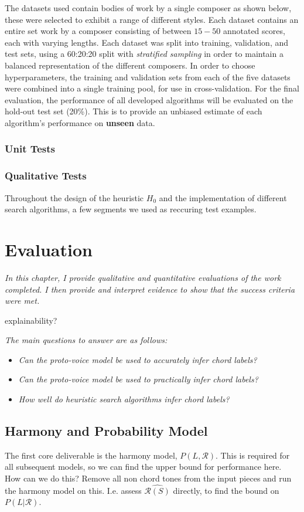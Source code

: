 \documentclass[12pt,a4paper,twoside,openany]{report} \usepackage[pdfborder={0 0 0}]{hyperref}    %
\theoremstyle{definition} \newtheorem{definition}{Definition}[section]
\begin{document}
The datasets used contain bodies of work by a single composer as shown below, these were selected to exhibit
a range of different styles. Each dataset contains an entire set work by a composer consisting of between $15-50$
annotated scores, each with varying lengths. Each dataset was split into training, validation, and test sets,
using a 60:20:20 split with \textit{stratified sampling} in order to maintain a balanced representation of the
different composers. In order to choose hyperparameters, the training and validation sets from each of the five
datasets were combined into a single training pool, for use in cross-validation. For the final evaluation, the
performance of all developed algorithms will be evaluated on the hold-out test set (20\%). This is to provide an
unbiased estimate of each algorithm's performance on \textbf{unseen} data.


\subsection{Unit Tests}
\label{sub:unittests}

\subsection{Qualitative Tests} Throughout the design of the heuristic $H_0$ and the implementation of different search
algorithms, a few segments we used as reccuring test examples.


\chapter{Evaluation} 
\label{chap:evaluation}
\textit{In this chapter, I provide qualitative and quantitative evaluations of the work completed.
I then provide and interpret evidence to show that the success criteria were met.}


explainability?


\textit{The main questions to answer are as follows:} \begin{itemize} \item \textit{Can the proto-voice model be used to
accurately infer chord labels?} \item \textit{Can the proto-voice model be used to practically infer chord labels?}
\item \textit{How well do heuristic search algorithms infer chord labels?} \end{itemize}

  \section{Harmony and Probability Model}
  \label{sec:evalHarmony}
  The first core deliverable is the harmony model, $P(L,\mathcal{R})$. This is required for all subsequent models, so we can find the upper bound for performance here. How can we do this? Remove all non chord tones from the input pieces and run the harmony model on this. I.e. assess $\hat{\mathcal{R}(S)}$ directly, to find the bound on $P(L|\mathcal{R})$. 
\end{document}
